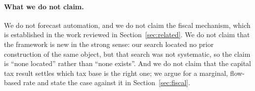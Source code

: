 \paragraph{What we do not claim.} We do not forecast automation, and we do not claim the fiscal
mechanism, which is established in the work reviewed in Section~\ref{sec:related}. We do not claim
that the framework is new in the strong sense: our search located no prior construction of the
same object, but that search was not systematic, so the claim is ``none located'' rather than
``none exists''. And we do not claim that the capital tax result settles which tax base is the
right one; we argue for a marginal, flow-based rate and state the case against it in
Section~\ref{sec:fiscal}.
